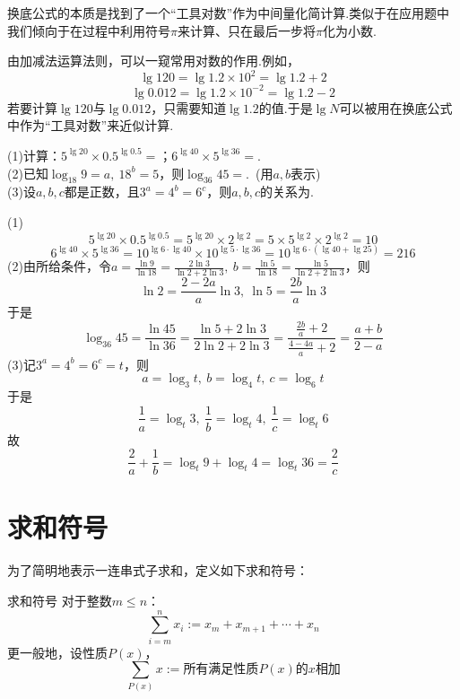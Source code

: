 \documentclass[lang=cn, zihao=5]{elegantbook}
\newcommand{\tk}{\uline{\hspace{4em}}}
\begin{document}
\begin{remark}
	换底公式的本质是找到了一个“工具对数”作为中间量化简计算.类似于在应用题中我们倾向于在过程中利用符号$\pi $来计算、只在最后一步将$\pi $化为小数.
\end{remark}
\begin{remark}
	由加减法运算法则，可以一窥常用对数的作用.例如，
	$$\lg{120} = \lg{1.2 \times 10^2} = \lg{1.2}+2$$
	$$\lg{0.012} = \lg{1.2 \times 10^{-2}} = \lg{1.2}-2$$
	若要计算$\lg{120}$与$\lg{0.012}$，只需要知道$\lg{1.2}$的值.于是$\lg{N}$可以被用在换底公式中作为“工具对数”来近似计算.
\end{remark}

\begin{example}
	(1)计算：$5^{\lg 20} \times 0.5^{\lg 0.5}=$\tk ；$6^{\lg 40} \times 5^{\lg 36}=$\tk . \\
	(2)已知$\log_{18}{9}=a,~18^b=5$，则$\log_{36}{45}=$\tk .~(用$a,b$表示) \\
	(3)设$a,b,c$都是正数，且$3^a=4^b=6^c$，则$a,b,c$的关系为\tk .
\end{example}
\begin{solution}
	(1)$$5^{\lg 20} \times 0.5^{\lg 0.5} = 5^{\lg 20} \times 2^{\lg 2} = 5 \times 5^{\lg 2} \times 2^{\lg 2} = 10$$
	$$6^{\lg 40} \times 5^{\lg 36} = 10^{\lg 6 \cdot \lg 40} \times 10^{\lg 5 \cdot \lg 36} = 10^{\lg 6 \cdot (\lg 40 + \lg 25)} = 216$$
	(2)由所给条件，令$a=\frac{\ln{9}}{\ln{18}}=\frac{2\ln{3}}{\ln{2}+2\ln{3}} ,~b=\frac{\ln{5}}{\ln{18}}=\frac{\ln{5}}{\ln{2}+2\ln{3}}$，则$$\ln{2}=\frac{2-2a}{a}\ln{3},~\ln{5}=\frac{2b}{a}\ln{3}$$
	于是
	$$\log_{36}{45} = \frac{\ln{45}}{\ln{36}} = \frac{\ln{5} + 2\ln{3}}{2\ln{2}+2\ln{3}} = \frac{\frac{2b}{a}+2}{\frac{4-4a}{a}+2} = \frac{a+b}{2-a}$$
	(3)记$3^a=4^b=6^c=t$，则$$a=\log_{3}{t},~b=\log_{4}{t},~c=\log_{6}{t}$$
	于是$$\frac{1}{a}=\log_{t}{3},~\frac{1}{b}=\log_{t}{4},~\frac{1}{c}=\log_{t}{6}$$
	故$$\frac{2}{a} + \frac{1}{b} = \log_{t}{9} + \log_{t}{4} = \log_{t}{36} = \frac{2}{c}$$
\end{solution}

\section{求和符号}

为了简明地表示一连串式子求和，定义如下求和符号：

\begin{definition}{求和符号}
	对于整数$m \leq n$：$$\sum_{i=m}^{n} x_i := x_m + x_{m+1} + \cdots + x_{n}$$
	更一般地，设性质$P(x)$，$$\sum_{P(x)} x := \textit{所有满足性质$P(x)$的$x$相加}$$
\end{definition}
\end{document}
